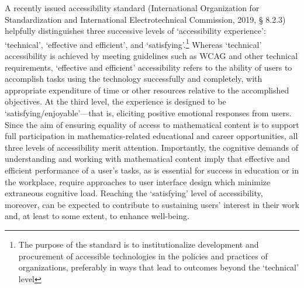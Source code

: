 \documentclass[11.5pt]{sig-alternate} %
\begin{document}
\begin{large}
A recently issued accessibility standard (International Organization for Standardization and International Electrotechnical Commission, 2019, § 8.2.3) helpfully distinguishes three successive levels of ‘accessibility experience’: ‘technical’, ‘effective and efficient’, and ‘satisfying’.\footnote{The purpose of the standard is to institutionalize development and procurement of accessible technologies in the policies and practices of organizations, preferably in ways that lead to outcomes beyond the ‘technical’ level} Whereas ‘technical’ accessibility is achieved by meeting guidelines such as WCAG and other technical requirements, ‘effective and efficient’ accessibility refers to the ability of users to accomplish tasks using the technology successfully and completely, with appropriate expenditure of time or other resources relative to the accomplished objectives. At the third level, the experience is designed to be ‘satisfying/enjoyable’—that is, eliciting positive emotional responses from users. Since the aim of ensuring equality of access to mathematical content is to support full participation in mathematics-related educational and career opportunities, all three levels of accessibility merit attention. Importantly, the cognitive demands of understanding and working with mathematical content imply that effective and efficient performance of a user’s tasks, as is essential for success in education or in the workplace, require approaches to user interface design which minimize extraneous cognitive load. Reaching the ‘satisfying’ level of accessibility, moreover, can be expected to contribute to sustaining users’ interest in their work and, at least to some extent, to enhance well-being.


\end{large}
\end{document}
